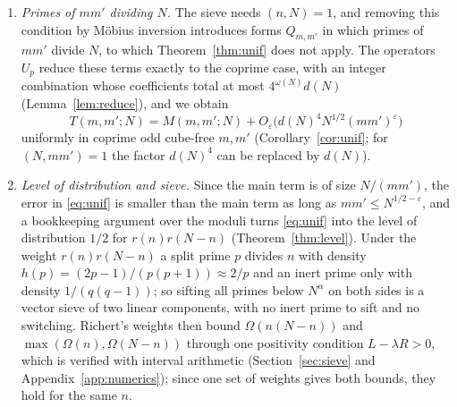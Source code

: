 \documentclass[11pt]{amsart}
\theoremstyle{remark}
\newcommand{\e}{\varepsilon}
\begin{document}
\begin{enumerate}[label=\textup{(\arabic*)},leftmargin=2.2em]
\item \emph{Primes of $mm'$ dividing $N$.} The sieve needs $(n,N)=1$, and removing this condition by M\"obius inversion introduces forms $Q_{m,m'}$ in which primes of $mm'$ divide $N$, to which Theorem~\ref{thm:unif} does not apply. The operators $U_p$ reduce these terms exactly to the coprime case, with an integer combination whose coefficients total at most $4^{\omega(N)}d(N)$ (Lemma~\ref{lem:reduce}), and we obtain
\begin{equation}\label{eq:unif}
T(m,m';N)=M(m,m';N)+O_\e\bigl(d(N)^{4}N^{1/2}(mm')^{\e}\bigr)
\end{equation}
uniformly in coprime odd cube-free $m,m'$ (Corollary~\ref{cor:unif}; for $(N,mm')=1$ the factor $d(N)^4$ can be replaced by $d(N)$).
\item \emph{Level of distribution and sieve.} Since the main term is of size $N/(mm')$, the error in \eqref{eq:unif} is smaller than the main term as long as $mm'\le N^{1/2-\e}$, and a bookkeeping argument over the moduli turns \eqref{eq:unif} into the level of distribution $1/2$ for $r(n)r(N-n)$ (Theorem~\ref{thm:level}). Under the weight $r(n)r(N-n)$ a split prime $p$ divides $n$ with density $h(p)=(2p-1)/(p(p+1))\approx 2/p$ and an inert prime only with density $1/(q(q-1))$; so sifting all primes below $N^{\alpha}$ on both sides is a vector sieve of two linear components, with no inert prime to sift and no switching. Richert's weights then bound $\Omega(n(N-n))$ and $\max(\Omega(n),\Omega(N-n))$ through one positivity condition $L-\lambda R>0$, which is verified with interval arithmetic (Section~\ref{sec:sieve} and Appendix~\ref{app:numerics}); since one set of weights gives both bounds, they hold for the same $n$.
\end{enumerate}
\end{document}
